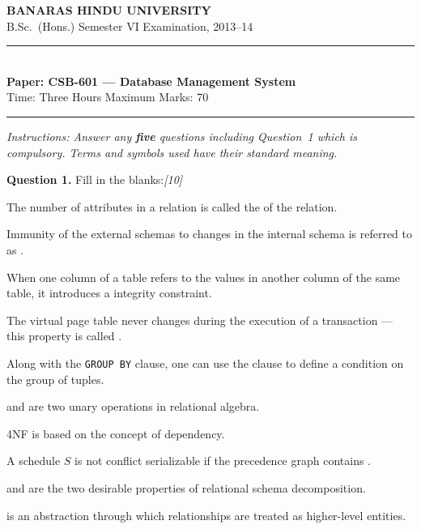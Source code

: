 \documentclass[11pt,a4paper]{article}
\newcommand{\pts}[1]{\hfill   \textit{[#1]}}
\begin{document}
\begin{center}
  {\large\bfseries BANARAS HINDU UNIVERSITY}\\[2pt]
  {\normalsize B.Sc.\ (Hons.) Semester VI Examination, 2013--14}\\[6pt]
  \rule{0.8\linewidth}{0.5pt}\\[6pt]
  {\large\bfseries Paper: CSB-601 --- Database Management System}\\[4pt]
  {\normalsize Time: Three Hours \hfill Maximum Marks: 70}
\end{center}

\rule{\linewidth}{0.4pt}

\smallskip



\noindent   \textit{Instructions: Answer any   \textbf{five} questions including Question~1 which is compulsory. Terms and symbols used have their standard meaning.}

\bigskip




\noindent   \textbf{Question 1.} Fill in the blanks:\pts{10}

\begin{parts}
  \item The number of attributes in a relation is called the \underline{\hspace{3cm}} of the relation.
  \item Immunity of the external schemas to changes in the internal schema is referred to as \underline{\hspace{3cm}}.
  \item When one column of a table refers to the values in another column of the same table, it introduces a \underline{\hspace{3cm}} integrity constraint.
  \item The virtual page table never changes during the execution of a transaction --- this property is called \underline{\hspace{3cm}}.
  \item Along with the   \texttt{GROUP BY} clause, one can use the \underline{\hspace{3cm}} clause to define a condition on the group of tuples.
  \item \underline{\hspace{3cm}} and \underline{\hspace{3cm}} are two unary operations in relational algebra.
  \item 4NF is based on the concept of \underline{\hspace{3cm}} dependency.
  \item A schedule $S$ is not conflict serializable if the precedence graph contains \underline{\hspace{3cm}}.
  \item \underline{\hspace{3cm}} and \underline{\hspace{3cm}} are the two desirable properties of relational schema decomposition.
  \item \underline{\hspace{3cm}} is an abstraction through which relationships are treated as higher-level entities.
\end{parts}
\end{document}
